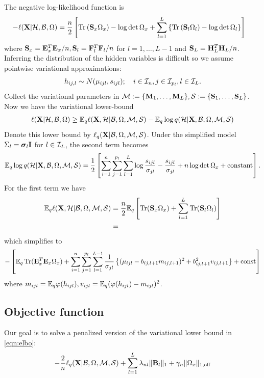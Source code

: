 \documentclass[11pt,letterpaper]{article}
\DeclareMathOperator*{\Tr}{Tr}
\numberwithin{equation}{section}
\begin{document}
The negative log-likelihood function is
%
\begin{align*}
-\ell( \bfX| \cH, \cB, \Omega) &= \frac{n}{2}\left[ \Tr \left(\bfS_x \Omega_x \right) - \log \det \Omega_x +
\sum_{l=1}^L \left\{ \Tr \left(\bfS_l \Omega_l \right) - \log \det \Omega_l \right\} \right]
\end{align*}
%
where ${\mathbf{S}}_x = {\mathbf{E}}_x^T {\mathbf{E}}_x/n, {\mathbf{S}}_l = {\mathbf{F}}_l^T {\mathbf{F}}_l/n$ for $l = 1, \ldots, L-1$ and ${\mathbf{S}}_L = {\mathbf{H}}_L^T {\mathbf{H}}_L/n$.
%
Inferring the distribution of the hidden variables is difficult so we assume pointwise variational approximations:
%
$$ h_{ij,l} \sim N(\mu_{ijl}, s_{ijl}); \quad i \in {\cal{I}}_n, j \in {\cal{I}}_{p_l}, l \in {\cal{I}}_L. $$
%
Collect the variational parameters in ${\cal{M}} := \{ {\mathbf{M}}_1, \ldots, {\mathbf{M}}_L\}, {\cal{S}}:= \{ {\mathbf{S}}_1, \ldots, {\mathbf{S}}_L\}$. Now we have the variational lower-bound
%
\begin{align}\label{eqn:elbo}
\ell( {\mathbf{X}}| {\cal{H}}, {\cal{B}}, \Omega) \geq
{\mathbb{E}}_q \ell ({\mathbf{X}},{\cal{H}}| {\cal{B}},\Omega,{\cal{M}},{\cal{S}}) - {\mathbb{E}}_q \log q({\cal{H}}| {\mathbf{X}}, {\cal{B}},\Omega,{\cal{M}},{\cal{S}})
\end{align}
%
Denote this lower bound by $\ell_q({\mathbf{X}}|{\cal{B}},\Omega,{\cal{M}},{\cal{S}})$. Under the simplified model $\Sigma_l = {\boldsymbol{\sigma}}_l {\mathbf{I}}$ for $l \in {\cal{I}}_L$, the second term becomes \citep{FreyHinton99}
%
\begin{align}\label{eqn:KLdivergence}
{\mathbb{E}}_q \log q({\cal{H}}| {\mathbf{X}}, {\cal{B}},\Omega,{\cal{M}},{\cal{S}}) = \frac{1}{2} \left[\sum_{i=1}^n \sum_{j=1}^{p_l} \sum_{l=1}^L \log \frac{s_{ijl}}{\sigma_{jl}} -\frac{s_{ijl}}{\sigma_{jl}} + n \log \det \Omega_x + \text{constant} \right].
\end{align}
%
For the first term we have
%
\begin{align*}
\BE_q \ell (\bfX,\cH| \cB,\Omega,\cM,\cS) &=
\frac{n}{2} \BE_q \left[ \Tr ( \bfS_x \Omega_x) + \sum_{l=1}^L \Tr(\bfS_l \Omega_l) \right]\\
&= 
\end{align*}
%
which simplifies to \citep{FreyHinton99}
%
\begin{align}\label{eqn:loglik}
- \left[ \BE_q \Tr(\bfE_x^T \bfE_x \Omega_x)  +
\sum_{i=1}^n \sum_{j=1}^{p_l} \sum_{l=1}^{L-1}
\frac{1}{\sigma_{jl}} \left\{ (\mu_{ijl} - b_{ij,l+1} m_{ij,l+1})^2 + b_{ij,l+1}^2 v_{ij,l+1} \right\} + \text{const} \right]
\end{align}
%
where $m_{ijl} = {\mathbb{E}}_q \varphi( h_{ijl}), v_{ijl} = {\mathbb{E}}_q (\varphi( h_{ijl}) - m_{ijl})^2$.

\subsection{Objective function}
Our goal is to solve a penalized version of the variational lower bound in \eqref{eqn:elbo}:
%
\begin{align*}
-\frac{2}{n} \ell_q({\mathbf{X}}|{\cal{B}},\Omega,{\cal{M}},{\cal{S}}) + \sum_{l=1}^L
\lambda_{nl} \| {\mathbf{B}}_l\|_1 +\gamma_n  \| \Omega_x \|_{1,\text{off}}
\end{align*}
%
\end{document}
